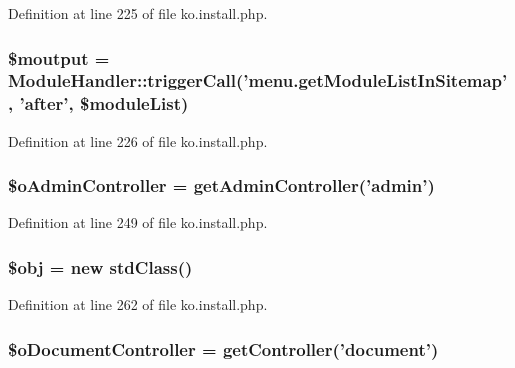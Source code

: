 Definition at line 225 of file ko.\-install.\-php.

\hypertarget{ko_8install_8php_a2598d068355cca17645bc6bd70cc3a8c}{
\subsubsection[{\$moutput}]{\setlength{\rightskip}{0pt plus 5cm}\$moutput = {\bf Module\-Handler\-::trigger\-Call}('menu.\-get\-Module\-List\-In\-Sitemap', 'after', \$module\-List)}}\label{ko_8install_8php_a2598d068355cca17645bc6bd70cc3a8c}


Definition at line 226 of file ko.\-install.\-php.

\hypertarget{ko_8install_8php_a52d90466dc7adee7d324b3ef032b8167}{
\subsubsection[{\$o\-Admin\-Controller}]{\setlength{\rightskip}{0pt plus 5cm}\$o\-Admin\-Controller = {\bf get\-Admin\-Controller}('{\bf admin}')}}\label{ko_8install_8php_a52d90466dc7adee7d324b3ef032b8167}


Definition at line 249 of file ko.\-install.\-php.

\hypertarget{ko_8install_8php_a9008ed94ba185855b1723e367744b87e}{
\subsubsection[{\$obj}]{\setlength{\rightskip}{0pt plus 5cm}\$obj = new std\-Class()}}\label{ko_8install_8php_a9008ed94ba185855b1723e367744b87e}


Definition at line 262 of file ko.\-install.\-php.

\hypertarget{ko_8install_8php_aac43fce682d4b7a05df6d3e44c2c54e6}{
\subsubsection[{\$o\-Document\-Controller}]{\setlength{\rightskip}{0pt plus 5cm}\$o\-Document\-Controller = {\bf get\-Controller}('{\bf document}')}}\label{ko_8install_8php_aac43fce682d4b7a05df6d3e44c2c54e6}


